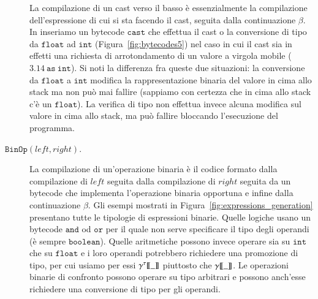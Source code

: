 \begin{description}
  La compilazione di un cast verso il basso \`e essenzialmente la compilazione
  dell'espressione di cui si sta facendo il cast, seguita dalla continuazione
  $\beta$. In \piu inseriamo un bytecode $\mathtt{cast}$
  che effettua il cast o la conversione di tipo da
  $\mathtt{float}$ ad $\mathtt{int}$ (Figura~\ref{fig:bytecodes5})
  nel caso in cui il cast sia in effetti
  una richiesta di arrotondamento di un valore a virgola mobile
  ($\mathtt{3.14\ as\ int}$). Si noti la differenza fra queste due
  situazioni: la conversione da $\mathtt{float}$ a $\mathtt{int}$
  modifica la rappresentazione binaria del valore in cima allo stack ma
  non pu\`o mai fallire (sappiamo con certezza che in cima allo stack
  c'\`e un $\mathtt{float}$). La verifica di tipo non effettua invece
  alcuna modifica sul valore in cima allo stack, ma pu\`o fallire
  bloccando l'esecuzione del programma.
\item[\underline{$\mathtt{BinOp(\mathit{left},\mathit{right})}$}.]
  La compilazione di un'operazione binaria \`e il codice formato
  dalla compilazione di $\mathit{left}$ seguita dalla compilazione
  di $\mathit{right}$ seguita da un bytecode che implementa
  l'operazione binaria opportuna e infine dalla continuazione $\beta$.
  Gli esempi mostrati in Figura~\ref{fig:expressions_generation}
  presentano tutte le tipologie di espressioni binarie.
  Quelle logiche usano un bytecode $\mathtt{and}$ od $\mathtt{or}$ per
  il quale non serve specificare il tipo degli operandi (\`e sempre
  $\mathtt{boolean}$). Quelle aritmetiche possono invece
  operare sia su $\mathtt{int}$ che su $\mathtt{float}$ e i loro
  operandi potrebbero richiedere una promozione di tipo, per cui usiamo
  per essi ${\gamma^{{\tau}}[\![{\_}]\!]}$ piuttosto che ${\gamma[\![{\_}]\!]}$. Le operazioni
  binarie di confronto possono operare su tipo arbitrari e possono
  anch'esse richiedere una conversione di tipo per gli operandi.
\end{description}

